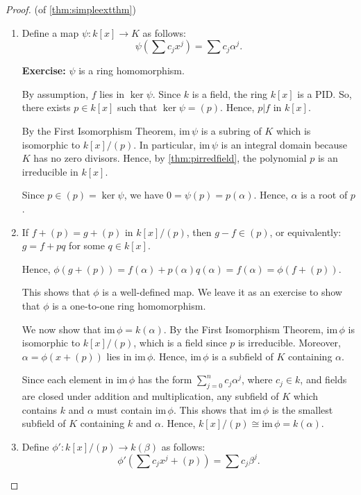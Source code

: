 \documentclass[a4paper,12pt]{report}
\newcommand{\im}{\mathrm{im}\,}
\newcommand{\ra}{\longrightarrow}
\numberwithin{statement}{chapter}
\numberwithin{equation}{chapter}
\numberwithin{section}{chapter}
\numberwithin{subsection}{section}
\begin{document}
\begin{proof}
(of \cref{thm:simpleextthm})
\begin{enumerate}
\item 
Define a map $\psi : k[x] \ra K$ as follows:
\[
\psi\left(\sum c_j x^j\right) = \sum c_j\alpha^j.
\]



 {\bf Exercise:}  $\psi$ is a ring homomorphism.


By assumption, $f$ lies in $\ker \psi$.
Since $k$ is a field, the ring $k[x]$ is a PID.
So, there exists $p \in k[x]$ such that $\ker \psi = (p)$.
Hence, $p | f$ in $k[x]$.




By the First Isomorphism Theorem, $\im \psi$ is a subring of $K$
which is isomorphic to $k[x]/(p)$.  In particular, $\im \psi$ is an integral domain
because $K$ has no zero divisors.
Hence, by \cref{thm:pirredfield}, the polynomial $p$ is an irreducible in $k[x]$.




Since $p \in (p) = \ker \psi$, we have $0 = \psi(p) = p(\alpha)$.  Hence,
$\alpha$ is a root of $p$.


\item 
If $f + (p) = g + (p)$ in $k[x]/(p)$, then $g - f \in (p)$, or equivalently:
$g =  f + pq$ for some $q \in k[x]$.




Hence, $\phi(g + (p)) = f(\alpha) + p(\alpha)q(\alpha) = f(\alpha) = \phi(f + (p))$.




This shows that $\phi$ is a well-defined map.  We leave it as an exercise to show
that $\phi$ is a one-to-one ring homomorphism.




We now show that $\im \phi = k(\alpha)$.
By the First Isomorphism Theorem, $\im \phi$ is isomorphic to $k[x]/(p)$,
which is a field since $p$ is irreducible.
Moreover, $\alpha = \phi(x + (p))$ lies in $\im \phi$.  Hence, $\im \phi$ is a subfield
of $K$ containing $\alpha$.


Since each element in $\im \phi$ has the form
$\sum_{j = 0}^n c_j \alpha^j$, where $c_j \in k$, and fields are closed under addition and multiplication,
any subfield of $K$ which contains $k$ and $\alpha$ must contain $\im \phi$.
This shows that $\im \phi$ is the smallest subfield of $K$ containing $k$ and $\alpha$.
Hence, $k[x]/(p) \cong \im \phi = k(\alpha)$.


\item 
Define $\phi' : k[x]/(p) \ra k(\beta)$ as follows:
\[
\phi'\left(\sum c_j x^j + (p)\right) = \sum c_j \beta^j.
\]


\end{enumerate}
\end{proof}
\end{document}
